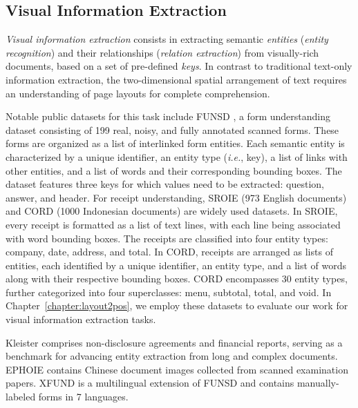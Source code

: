\subsection{Visual Information Extraction}
\label{section:related-document-understanding-visual-information-extraction}

  

\textit{Visual information extraction} consists in extracting semantic \textit{entities} (\textit{entity recognition}) and their relationships (\textit{relation extraction}) from visually-rich documents, based on a set of pre-defined \textit{keys}. In contrast to traditional text-only information extraction, the two-dimensional spatial arrangement of text requires an understanding of page layouts for complete comprehension. 

Notable public datasets for this task include \ac{FUNSD} \citep{jaume2019funsd}, a form understanding dataset consisting of 199 real, noisy, and fully annotated scanned forms. These forms are organized as a list of interlinked form entities. Each semantic entity is characterized by a unique identifier, an entity type (\textit{i.e.}, key), a list of links with other entities, and a list of words and their corresponding bounding boxes. The dataset features three keys for which values need to be extracted: question, answer, and header. For receipt understanding, \ac{SROIE} \citep{huang2019icdar2019} (973 English documents) and \ac{CORD} \citep{park2019cord} (1000 Indonesian documents) are widely used datasets. In \ac{SROIE}, every receipt is formatted as a list of text lines, with each line being associated with word bounding boxes. The receipts are classified into four entity types: company, date, address, and total. In \ac{CORD}, receipts are arranged as lists of entities, each identified by a unique identifier, an entity type, and a list of words along with their respective bounding boxes. \ac{CORD} encompasses 30 entity types, further categorized into four superclasses: menu, subtotal, total, and void. In Chapter~\ref{chapter:layout2pos}, we employ these datasets to evaluate our work for visual information extraction tasks.

Kleister \citep{gralinski2020kleister} comprises non-disclosure agreements and financial reports, serving as a benchmark for advancing entity extraction from long and complex documents. EPHOIE \citep{wang2021towards} contains Chinese document images collected from scanned examination papers. XFUND is a multilingual extension of \ac{FUNSD} \citep{xu-etal-2022-xfund} and contains manually-labeled forms in 7 languages.


